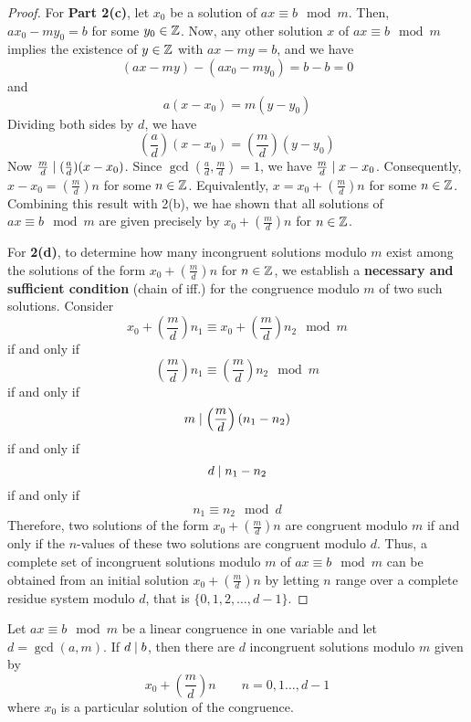 \begin{proof}
    For \textbf{Part 2(c)}, let $x_0$ be a solution of $ax \equiv b \mod m$. Then, $ax_0 - my_0 = b$ for some $y_0 \in \mathbb{Z}$. Now, any other solution $x$ of $ax \equiv b \mod m$ implies the existence of $y \in \mathbb{Z}$ with $ax - my = b$, and we have
    $$
    (ax - my) - (ax_0 - my_0) = b - b = 0
    $$
    and
    $$
    a(x-x_0) = m(y-y_0)
    $$
    Dividing both sides by $d$, we have
    $$
    \left( \frac{a}{d} \right) (x-x_0) = \left( \frac{m}{d} \right) (y-y_0)
    $$
    Now $\frac{m}{d}\mathrel{\mid} (\frac{a}{d}) (x-x_0)$. Since $\gcd(\frac{a}{d}, \frac{m}{d}) = 1$, we have $\frac{m}{d} \mathrel{\mid} x-x_0$. Consequently, $x-x_0 = (\frac{m}{d}) n$ for some $n \in \mathbb{Z}$. Equivalently, $x = x_0 + (\frac{m}{d})n$ for some $n \in \mathbb{Z}$. Combining this result with 2(b), we hae shown that all solutions of $ax \equiv b \mod m$ are given precisely by $x_0 + (\frac{m}{d})n$ for $n \in \mathbb{Z}$.
    
    For \textbf{2(d)}, to determine how many incongruent solutions modulo $m$ exist among the solutions of the form $x_0 + (\frac{m}{d})n$ for $n \in \mathbb{Z}$, we establish a \textbf{necessary and sufficient condition} (chain of iff.) for the congruence modulo $m$ of two such solutions. Consider
    $$
    x_0 + \left( \frac{m}{d} \right) n_1 \equiv x_0 + \left( \frac{m}{d} \right) n_2 \mod m
    $$
    if and only if
    $$
    \left( \frac{m}{d} \right) n_1 \equiv \left( \frac{m}{d} \right) n_2 \mod m 
    $$
    if and only if
    $$
    m \mathrel{\mid} \left( \frac{m}{d} \right) (n_1-n_2)
    $$
    if and only if
    $$
    d \mathrel{\mid} n_1 - n_2
    $$
    if and only if
    $$
    n_1 \equiv n_2 \mod d
    $$
    Therefore, two solutions of the form $x_0 + (\frac{m}{d}) n$ are congruent modulo $m$ if and only if the $n$-values of these two solutions are congruent modulo $d$. Thus, a complete set of incongruent solutions modulo $m$ of $ax \equiv b \mod m$ can be obtained from an initial solution $x_0 + (\frac{m}{d})n$ by letting $n$ range over a complete residue system modulo $d$, that is $\{0,1,2,\ldots,d-1\}$.
\end{proof}

\begin{corollary} \label{cor:all-congruence-solutions}
    Let $ax \equiv b \mod m$ be a linear congruence in one variable and let $d = \gcd(a,m)$. If $d \mathrel{\mid} b$, then there are $d$ incongruent solutions modulo $m$ given by
    $$
    x_0 + \left( \frac{m}{d} \right) n \qquad n = 0,1\ldots,d-1
    $$
    where $x_0$ is a particular solution of the congruence.
\end{corollary}

